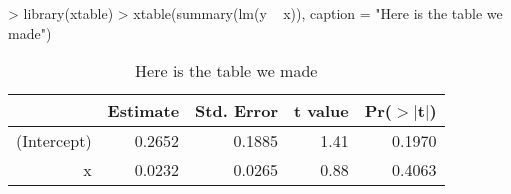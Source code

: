 \documentclass[12pt]{article}         %
\begin{document}
\begin{Schunk}
\begin{Sinput}
> library(xtable)
> xtable(summary(lm(y ~ x)), caption = "Here is the table we made")
\end{Sinput}
% latex table generated in R 2.13.0 by xtable 1.5-6 package
% Fri May 27 12:11:13 2011
\begin{table}[ht]
\begin{center}
\begin{tabular}{rrrrr}
  \hline
 & Estimate & Std. Error & t value & Pr($>$$|$t$|$) \\ 
  \hline
(Intercept) & 0.2652 & 0.1885 & 1.41 & 0.1970 \\ 
  x & 0.0232 & 0.0265 & 0.88 & 0.4063 \\ 
   \hline
\end{tabular}
\caption{Here is the table we made}
\end{center}
\end{table}\end{Schunk}
\end{document}

